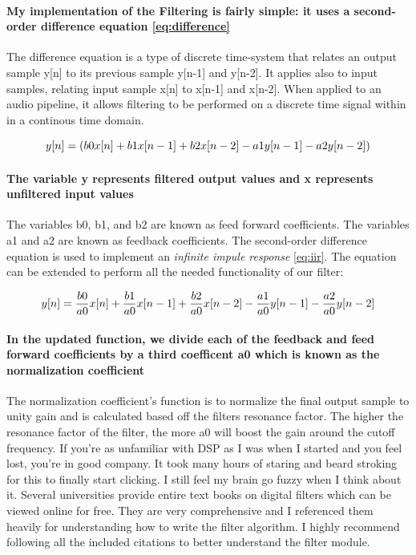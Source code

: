 \documentclass[acmlarge,screen]{acmart}
\begin{document}
	\paragraph{My implementation of the Filtering is fairly simple: it uses a second-order difference equation \eqref{eq:difference}} The difference equation is a type of discrete time-system that relates an output sample y[n] to its previous sample y[n-1] and y[n-2]. It applies also to input samples, relating input sample x[n] to x[n-1] and x[n-2]. When applied to an audio pipeline, it allows filtering to be performed on a discrete time signal within in a continous time domain.\cite{stanford_2007}
	
	\begin{equation}
		\large
		y[n] = (b0x[n] + b1x[n-1] + b2x[n-2] - a1y[n-1] - a2y[n-2])
		\label{eq:difference}
	\end{equation}

	\paragraph{The variable y represents filtered output values and x represents unfiltered input values} The variables b0, b1, and b2 are known as feed forward coefficients. The variables a1 and a2 are known as feedback coefficients. The second-order difference equation is used to implement an \textit{infinite impule response} \eqref{eq:iir}. The equation can be extended to perform all the needed functionality of our filter:
	
	\begin{equation}
		\large
		y[n] = \frac{b0}{a0}x[n] + \frac{b1}{a0}x[n-1] + \frac{b2}{a0}x[n-2] - \frac{a1}{a0}y[n-1] - \frac{a2}{a0}y[n-2]
		\label{eq:iir}
	\end{equation}
	
	\paragraph{In the updated function, we divide each of the feedback and feed forward coefficients by a third coefficent a0 which is known as the normalization coefficient} The normalization coefficient's function is to normalize the final output sample to unity gain and is calculated based off the filters resonance factor. The higher the resonance factor of the filter, the more a0 will boost the gain around the cutoff frequency. If you're as unfamiliar with DSP as I was when I started and you feel lost, you're in good company. It took many hours of staring and beard stroking for this to finally start clicking. I still feel my brain go fuzzy when I think about it. Several universities provide entire text books on digital filters which can be viewed online for free. They are very comprehensive and I referenced them heavily for understanding how to write the filter algorithm. I highly recommend following all the included citations to better understand the filter module. \cite{lacamera_2020}
	
\end{document}
